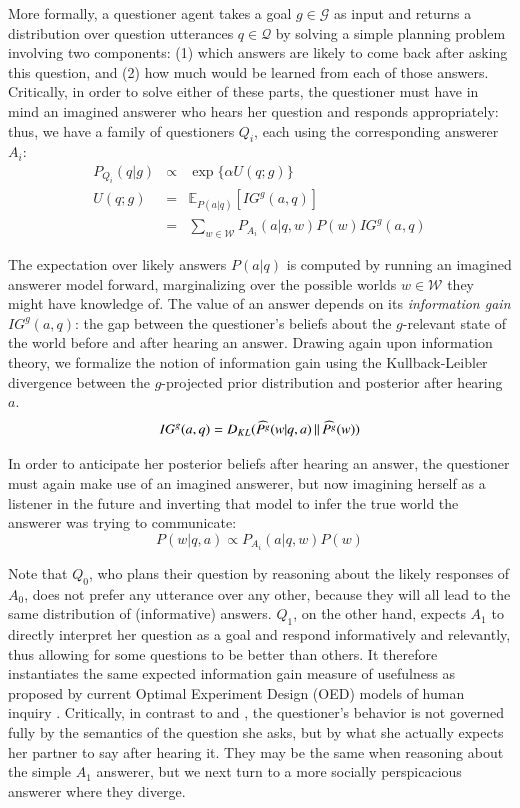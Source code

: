 \documentclass[12pt, floatsintext, jou]{apa6}
\newcommand{\KL}[2]{\ensuremath{D_{KL}({#1}\, \| \, {#2})}}
\newcommand{\E}[2]{\ensuremath{\mathbb{E}_{#1}\left [#2 \right]}}
\begin{document}
More formally, a questioner agent takes a goal $g \in \mathcal{G}$ as input and returns a distribution over question utterances $q \in \mathcal{Q}$ by solving a simple planning problem involving two components: (1) which answers are likely to come back after asking this question, and (2) how much would be learned from each of those answers. Critically, in order to solve either of these parts, the questioner must have in mind an imagined answerer who hears her question and responds appropriately: thus, we have a family of questioners $Q_i$, each using the corresponding answerer $A_i$:
%
$$
\begin{array}{lcl}
P_{Q_i}(q|g)  & \propto & \exp\{\alpha U(q;g)\} \\
U(q;g) & = & \E{P(a|q)}{IG^g(a,q)} \\
	 & = & \sum_{w\in\mathcal{W}} P_{A_i}(a|q,w)P(w) IG^g(a,q)
\end{array}
$$
%

The expectation over likely answers $P(a|q)$ is computed by running an imagined answerer model forward, marginalizing over the possible worlds $w \in\mathcal{W}$ they might have knowledge of. The value of an answer depends on its \emph{information gain} $IG^g(a,q)$: the gap between the questioner's beliefs about the $g$-relevant state of the world before and after hearing an answer. Drawing again upon information theory, we formalize the notion of information gain using the Kullback-Leibler divergence between the $g$-projected prior distribution and posterior after hearing $a$.
%
$$
IG^g(a,q) = \KL{\widehat{P^g}(w|q, a)}{\widehat{P^g}(w)}\\
$$
%

In order to anticipate her posterior beliefs after hearing an answer, the questioner must again make use of an imagined answerer, but now imagining herself as a listener in the future and inverting that model to infer the true world the answerer was trying to communicate:
$$P(w|q,a) \propto P_{A_i}(a| q, w)P(w)$$

Note that $Q_0$, who plans their question by reasoning about the likely responses of $A_0$, does not prefer any utterance over any other, because they will all lead to the same distribution of (informative) answers. $Q_1$, on the other hand, expects $A_1$ to directly interpret her question as a goal and respond informatively and relevantly, thus allowing for some questions to be better than others. It therefore instantiates the same expected information gain measure of usefulness as proposed by current Optimal Experiment Design (OED) models of human inquiry \cite{CoenenNelsonGureckis17_OED}. Critically, in contrast to  and , the questioner's behavior is not governed fully by the semantics of the question she asks, but by what she actually expects her partner to say after hearing it. They may be the same when reasoning about the simple $A_1$ answerer, but we next turn to a more socially perspicacious answerer where they diverge.
\end{document}
